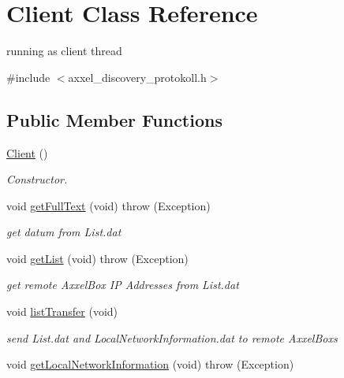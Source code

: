 \hypertarget{classClient}{\section{Client Class Reference}
\label{classClient}
}


running as client thread  




{\ttfamily \#include $<$axxel\-\_\-discovery\-\_\-protokoll.\-h$>$}

\subsection*{Public Member Functions}
\begin{DoxyCompactItemize}
\item 
\hyperlink{classClient_ae51af7aa6b8f591496a8f6a4a87a14bf}{Client} ()
\begin{DoxyCompactList}\small\item\em Constructor. \end{DoxyCompactList}\item 
\hypertarget{classClient_af97a445c9fbfff98a418f1870f103398}{void \hyperlink{classClient_af97a445c9fbfff98a418f1870f103398}{get\-Full\-Text} (void)  throw (\-Exception)}\label{classClient_af97a445c9fbfff98a418f1870f103398}

\begin{DoxyCompactList}\small\item\em get datum from List.\-dat \end{DoxyCompactList}\item 
\hypertarget{classClient_ac184e321f16e0f86c36cdc2a6e9f412b}{void \hyperlink{classClient_ac184e321f16e0f86c36cdc2a6e9f412b}{get\-List} (void)  throw (\-Exception)}\label{classClient_ac184e321f16e0f86c36cdc2a6e9f412b}

\begin{DoxyCompactList}\small\item\em get remote Axxel\-Box I\-P Addresses from List.\-dat \end{DoxyCompactList}\item 
\hypertarget{classClient_a1f385d68275ac367f9d2a868904fd7f6}{void \hyperlink{classClient_a1f385d68275ac367f9d2a868904fd7f6}{list\-Transfer} (void)}\label{classClient_a1f385d68275ac367f9d2a868904fd7f6}

\begin{DoxyCompactList}\small\item\em send List.\-dat and Local\-Network\-Information.\-dat to remote Axxel\-Boxs \end{DoxyCompactList}\item 
\hypertarget{classClient_a12ffafa5e304fd18d4e8d883a13216ed}{void \hyperlink{classClient_a12ffafa5e304fd18d4e8d883a13216ed}{get\-Local\-Network\-Information} (void)  throw (\-Exception)}\label{classClient_a12ffafa5e304fd18d4e8d883a13216ed}


\end{DoxyCompactItemize}
